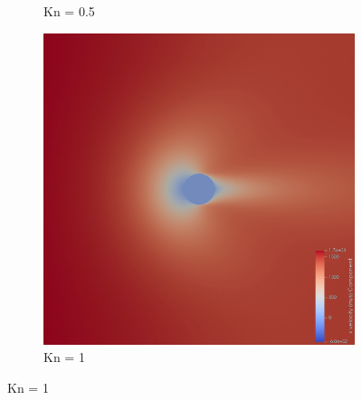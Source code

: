 \begin{figure}
\begin{subfigure}{0.32\textwidth}
        \caption{Kn = 0.5}
    \end{subfigure}
    \hfill
    \begin{subfigure}{0.32\textwidth}
        \centering
        \includegraphics[width=\textwidth]{Images/4. Results/Circle Kn/pv/Kn1.png}
        \caption{Kn = 1}
    \end{subfigure}
    
    \vspace{5pt}
    

\end{figure}

